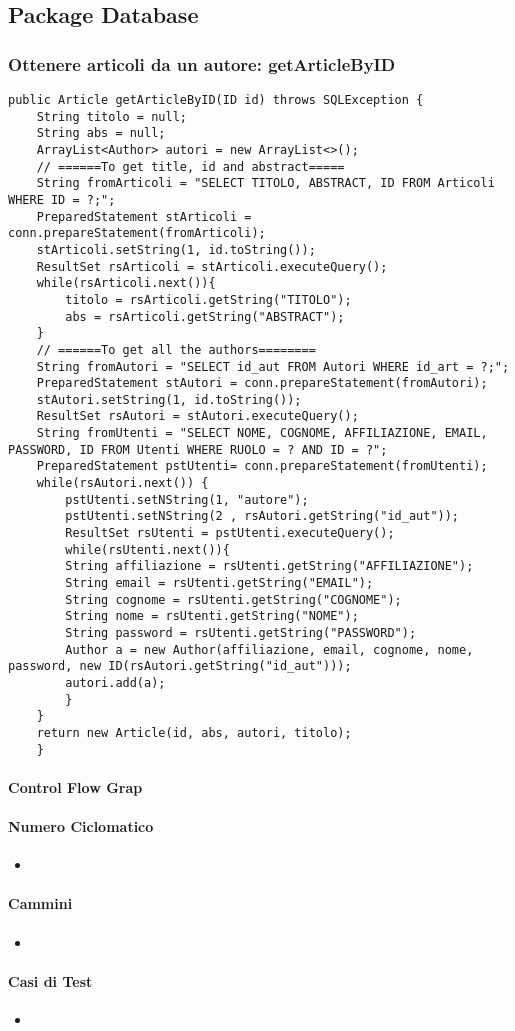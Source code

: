 \subsection{Package Database}
\label{sec:test_strutturale_package_database}

\subsubsection{Ottenere articoli da un autore: getArticleByID}
\begin{lstlisting}
public Article getArticleByID(ID id) throws SQLException {
	String titolo = null;
	String abs = null;
	ArrayList<Author> autori = new ArrayList<>();
	// ======To get title, id and abstract=====
	String fromArticoli = "SELECT TITOLO, ABSTRACT, ID FROM Articoli WHERE ID = ?;";
	PreparedStatement stArticoli = conn.prepareStatement(fromArticoli);
	stArticoli.setString(1, id.toString());
	ResultSet rsArticoli = stArticoli.executeQuery();
	while(rsArticoli.next()){
	    titolo = rsArticoli.getString("TITOLO");
	    abs = rsArticoli.getString("ABSTRACT");
	}
	// ======To get all the authors========
	String fromAutori = "SELECT id_aut FROM Autori WHERE id_art = ?;";
	PreparedStatement stAutori = conn.prepareStatement(fromAutori);
	stAutori.setString(1, id.toString());
	ResultSet rsAutori = stAutori.executeQuery();
	String fromUtenti = "SELECT NOME, COGNOME, AFFILIAZIONE, EMAIL, PASSWORD, ID FROM Utenti WHERE RUOLO = ? AND ID = ?";
	PreparedStatement pstUtenti= conn.prepareStatement(fromUtenti);
	while(rsAutori.next()) {
	    pstUtenti.setNString(1, "autore");
	    pstUtenti.setNString(2 , rsAutori.getString("id_aut"));
	    ResultSet rsUtenti = pstUtenti.executeQuery();
	    while(rsUtenti.next()){
		String affiliazione = rsUtenti.getString("AFFILIAZIONE");
		String email = rsUtenti.getString("EMAIL");
		String cognome = rsUtenti.getString("COGNOME");
		String nome = rsUtenti.getString("NOME");
		String password = rsUtenti.getString("PASSWORD");
		Author a = new Author(affiliazione, email, cognome, nome, password, new ID(rsAutori.getString("id_aut")));
		autori.add(a);
	    }  
	}
	return new Article(id, abs, autori, titolo);
    }

\end{lstlisting}
\paragraph{Control Flow Grap}
\paragraph{Numero Ciclomatico}
\begin{itemize}
\item
\end{itemize}
\paragraph{Cammini}
\begin{itemize}
\item
\end{itemize}
\paragraph{Casi di Test}
\begin{itemize}
\item
\end{itemize}

